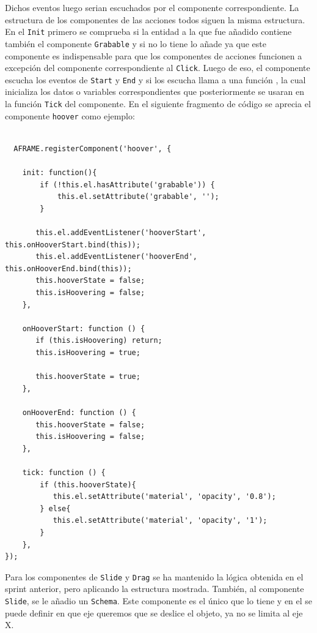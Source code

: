 \documentclass[a4paper, 12pt]{book}
\begin{document}
Dichos eventos luego serian escuchados por el componente correspondiente. La estructura de los componentes de las acciones todos siguen la misma estructura. En el \texttt{Init} primero se comprueba si la entidad a la que fue añadido contiene también el componente \texttt{Grabable} y si no lo tiene lo añade ya que este componente es indispensable para que los componentes de acciones funcionen a excepción del componente correspondiente al \texttt{Click}. Luego de eso, el componente escucha los eventos de \texttt{Start} y \texttt{End} y si los escucha llama a una función
, la cual inicializa los datos o variables correspondientes que posteriormente se usaran en la función \texttt{Tick} del componente. En el siguiente fragmento de código se aprecia el componente \texttt{hoover} como ejemplo:

\begin{lstlisting}[caption=Componente Hoover, captionpos=b, label=lst:Hoover]
  
  AFRAME.registerComponent('hoover', {

    init: function(){
        if (!this.el.hasAttribute('grabable')) {
            this.el.setAttribute('grabable', '');
        }

       this.el.addEventListener('hooverStart', this.onHooverStart.bind(this));
       this.el.addEventListener('hooverEnd', this.onHooverEnd.bind(this));
       this.hooverState = false;
       this.isHoovering = false;
    },

    onHooverStart: function () {
       if (this.isHoovering) return;
       this.isHoovering = true;

       this.hooverState = true;
    },

    onHooverEnd: function () {
       this.hooverState = false;
       this.isHoovering = false;
    },

    tick: function () {
        if (this.hooverState){
           this.el.setAttribute('material', 'opacity', '0.8');
        } else{
           this.el.setAttribute('material', 'opacity', '1');
        }
    },
});
\end{lstlisting}

Para los componentes de \texttt{Slide} y \texttt{Drag} se ha mantenido la lógica obtenida en el sprint anterior, pero aplicando la estructura mostrada. 
También, al componente \texttt{Slide}, se le añadio un \texttt{Schema}. Este componente es el único que lo tiene y en el se puede definir en que eje queremos que se deslice el objeto, ya no se limita al eje X.
\end{document}

